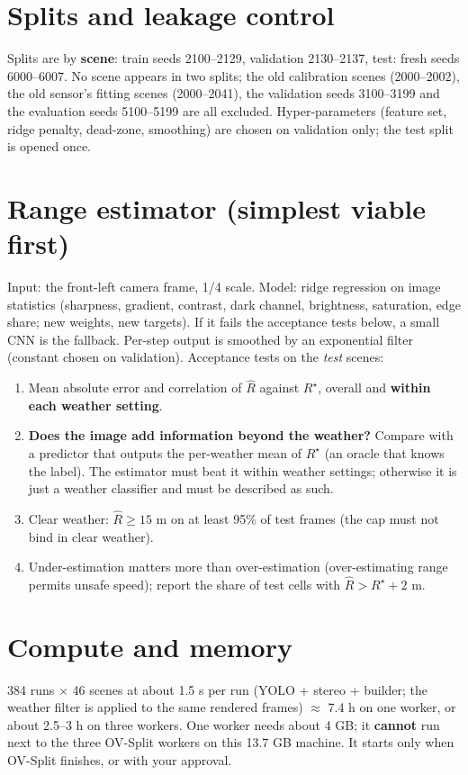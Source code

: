 \documentclass[11pt,a4paper]{article}
\begin{document}
\section{Splits and leakage control}
Splits are by \textbf{scene}: train seeds 2100--2129, validation 2130--2137, test: fresh seeds 6000--6007. No scene appears in two splits; the old calibration scenes (2000--2002), the old sensor's fitting scenes (2000--2041), the validation seeds 3100--3199 and the evaluation seeds 5100--5199 are all excluded. Hyper-parameters (feature set, ridge penalty, dead-zone, smoothing) are chosen on validation only; the test split is opened once.

\section{Range estimator (simplest viable first)}
Input: the front-left camera frame, 1/4 scale. Model: ridge regression on image statistics (sharpness, gradient, contrast, dark channel, brightness, saturation, edge share; new weights, new targets). If it fails the acceptance tests below, a small CNN is the fallback. Per-step output is smoothed by an exponential filter (constant chosen on validation).
Acceptance tests on the \emph{test} scenes:
\begin{enumerate}
\item Mean absolute error and correlation of $\hat R$ against $R^{\star}$, overall and \textbf{within each weather setting}.
\item \textbf{Does the image add information beyond the weather?} Compare with a predictor that outputs the per-weather mean of $R^{\star}$ (an oracle that knows the label). The estimator must beat it within weather settings; otherwise it is just a weather classifier and must be described as such.
\item Clear weather: $\hat R\ge15$ m on at least 95\% of test frames (the cap must not bind in clear weather).
\item Under-estimation matters more than over-estimation (over-estimating range permits unsafe speed); report the share of test cells with $\hat R>R^{\star}+2$ m.
\end{enumerate}

\section{Compute and memory}
384 runs $\times$ 46 scenes at about 1.5 s per run (YOLO + stereo + builder; the weather filter is applied to the same rendered frames) $\approx$ 7.4 h on one worker, or about 2.5--3 h on three workers. One worker needs about 4 GB; it \textbf{cannot} run next to the three OV-Split workers on this 13.7 GB machine. It starts only when OV-Split finishes, or with your approval.
\end{document}
